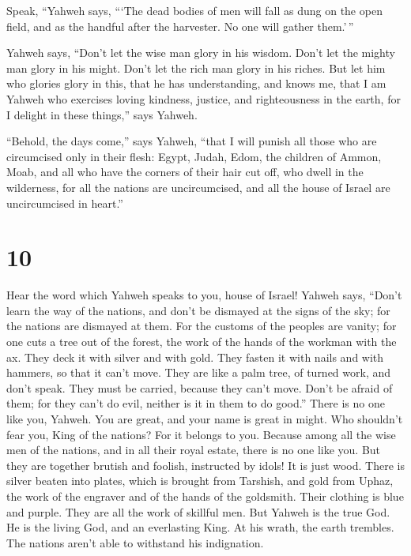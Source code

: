  Speak, ``Yahweh says, ```The dead bodies of men will
fall as dung on the open field, and as the handful after the harvester.
No one will gather them.'\,''

 Yahweh says, ``Don't let the wise man glory in his
wisdom. Don't let the mighty man glory in his might. Don't let the rich
man glory in his riches.  But let him who glories glory
in this, that he has understanding, and knows me, that I am Yahweh who
exercises loving kindness, justice, and righteousness in the earth, for
I delight in these things,'' says Yahweh.

 ``Behold, the days come,'' says Yahweh, ``that I will
punish all those who are circumcised only in their flesh:
 Egypt, Judah, Edom, the children of Ammon, Moab, and all
who have the corners of their hair cut off, who dwell in the wilderness,
for all the nations are uncircumcised, and all the house of Israel are
uncircumcised in heart.''

\hypertarget{section-9}{%
\section{10}\label{section-9}}

 Hear the word which Yahweh speaks to you, house of
Israel!  Yahweh says, ``Don't learn the way of the
nations, and don't be dismayed at the signs of the sky; for the nations
are dismayed at them.  For the customs of the peoples are
vanity; for one cuts a tree out of the forest, the work of the hands of
the workman with the ax.  They deck it with silver and
with gold. They fasten it with nails and with hammers, so that it can't
move.  They are like a palm tree, of turned work, and
don't speak. They must be carried, because they can't move. Don't be
afraid of them; for they can't do evil, neither is it in them to do
good.''  There is no one like you, Yahweh. You are great,
and your name is great in might.  Who shouldn't fear you,
King of the nations? For it belongs to you. Because among all the wise
men of the nations, and in all their royal estate, there is no one like
you.  But they are together brutish and foolish,
instructed by idols! It is just wood.  There is silver
beaten into plates, which is brought from Tarshish, and gold from Uphaz,
the work of the engraver and of the hands of the goldsmith. Their
clothing is blue and purple. They are all the work of skillful men.
 But Yahweh is the true God. He is the living God, and an
everlasting King. At his wrath, the earth trembles. The nations aren't
able to withstand his indignation.

